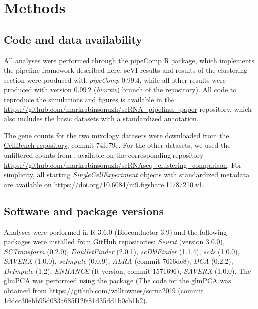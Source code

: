 \documentclass{bmcart}
\begin{document}
\section*{Methods}

\subsection*{Code and data availability}

All analyses were performed through the \href{https://github.com/plger/pipeComp}{pipeComp} R package, which implements the pipeline framework described here. scVI results and results of the clustering section were produced with \textit{pipeComp} 0.99.4, while all other results were produced with version 0.99.2 (\textit{biorxiv}) branch of the repository). All code to reproduce the simulations and figures is available in the \url{https://github.com/markrobinsonuzh/scRNA\_pipelines\_paper} repository, which also includes the basic datasets with a standardized annotation.

The gene counts for the two mixology datasets were downloaded from the  \href{https://github.com/LuyiTian/CellBench_data/data/sincell_with_class.RData}{CellBench repository}, commit 74fe79e. For the other datasets, we used the unfiltered counts from \cite{duoClustering2018}, available on the corresponding repository \url{https://github.com/markrobinsonuzh/scRNAseq\_clustering\_comparison}. For simplicity, all starting \textit{SingleCellExperiment} objects with standardized metadata are available on \url{https://doi.org/10.6084/m9.figshare.11787210.v1}.

\subsection*{Software and package versions}
Analyses were performed in R 3.6.0 (Bioconductor 3.9) and the following packages were installed from GitHub repositories: \textit{Seurat} (version 3.0.0), \textit{SCTransform} (0.2.0), \textit{DoubletFinder} (2.0.1), \textit{scDblFinder} (1.1.4), \textit{scds} (1.0.0), \textit{SAVERX} (1.0.0), \textit{scImpute} (0.0.9), \textit{ALRA} (commit 7636de8), \textit{DCA} (0.2.2), \textit{DrImpute} (1.2), \textit{ENHANCE} (R version, commit 1571696), \textit{SAVERX} (1.0.0). The glmPCA was performed using the  package (The code for the glmPCA was obtained from \url{https://github.com/willtownes/scrna2019} (commit 1ddcc30ebb95d083a685f12fe81d35dd1b0cb1b2).
\end{document}

